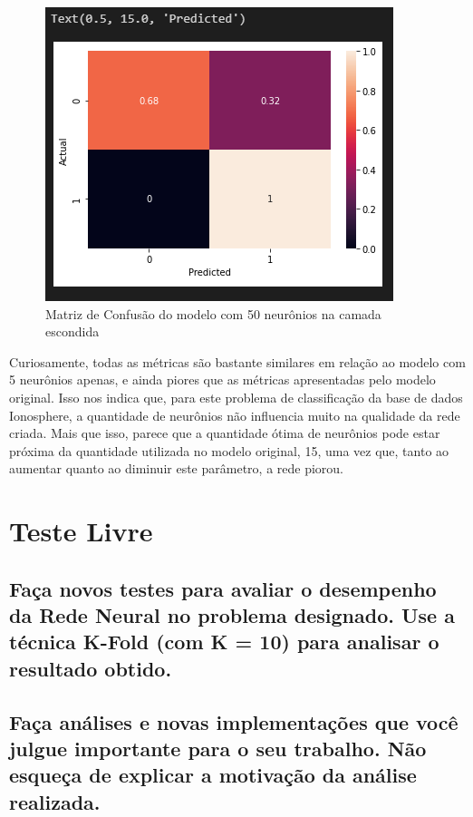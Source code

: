 \documentclass[12pt]{article}
\begin{document}
\begin{figure}[H]
	\centering
	\includegraphics[width=0.7\linewidth]{Imagens/50neuronios/confusao50neuronios}
	\caption{Matriz de Confusão do modelo com 50 neurônios na camada escondida}
	\label{fig:confusao50neuronios}
\end{figure}

Curiosamente, todas as métricas são bastante similares em relação ao modelo com 5 neurônios apenas, e ainda piores que as métricas apresentadas pelo modelo original. Isso nos indica que, para este problema de classificação da base de dados Ionosphere, a quantidade de neurônios não influencia muito na qualidade da rede criada. Mais que isso, parece que a quantidade ótima de neurônios pode estar próxima da quantidade utilizada no modelo original, 15, uma vez que, tanto ao aumentar quanto ao diminuir este parâmetro, a rede piorou. 
\section{Teste Livre}\label{sec:testelivre}

\subsection{Faça novos testes para avaliar o desempenho da Rede Neural no	problema designado. Use a técnica K-Fold (com K = 10) para analisar o	resultado obtido.}

\subsection{Faça análises e novas implementações que você julgue importante para o seu trabalho. Não esqueça de explicar a motivação da análise realizada.}
\end{document}
